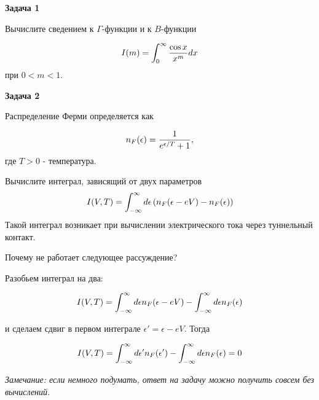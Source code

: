 \documentclass[a4paper,12pt]{article}
\begin{document}
\vspace{15pt}
\noindent \textbf{Задача 1}

\noindent Вычислите сведением к $\Gamma$-функции и к $B$-функции

\begin{equation}
I(m)	=\int_{0}^{\infty}\frac{\cos x}{x^{m}}dx \notag
\end{equation}
при $0<m<1$.

\vspace{15pt}
\noindent \textbf{Задача 2}

\noindent Распределение Ферми определяется как

\begin{equation}
n_{F}(\epsilon)	=\frac{1}{e^{\epsilon/T}+1},\notag
\end{equation}
где $T>0$ - температура.

\noindent Вычислите интеграл, зависящий от двух параметров
\begin{equation}
I(V,T)	=\int_{-\infty}^{\infty}d\epsilon\left(n_{F}(\epsilon-eV)-n_{F}(\epsilon)\right)\notag
\end{equation}
\noindent Такой интеграл возникает при вычислении электрического тока через туннельный контакт.

\noindent Почему не работает следующее рассуждение?

\noindent Разобьем интеграл на два:

\begin{equation}
I(V,T)	=\int_{-\infty}^{\infty}d\epsilon n_{F}(\epsilon-eV)-\int_{-\infty}^{\infty}d\epsilon n_{F}(\epsilon)\notag
\end{equation}

\noindent и сделаем сдвиг в первом интеграле $\epsilon'=\epsilon-eV$. Тогда

\begin{equation} 
I(V,T)	=\int_{-\infty}^{\infty}d\epsilon'n_{F}(\epsilon')-\int_{-\infty}^{\infty}d\epsilon n_{F}(\epsilon)=0 \notag
\end{equation}

\noindent \textit{Замечание: если немного подумать, ответ на задачу можно получить совсем без вычислений.}
\end{document}
